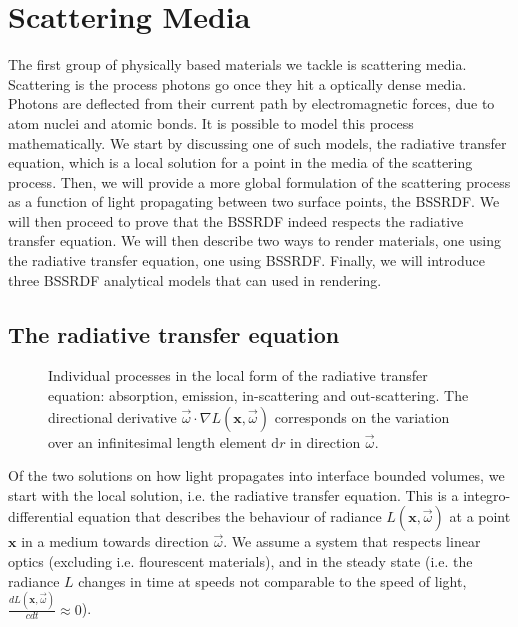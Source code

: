 \section{Scattering Media}
\label{sec:scatteringtheory}
The first group of physically based materials we tackle is scattering media. Scattering is the process photons go once they hit a optically dense media. Photons are deflected from their current path by electromagnetic forces, due to atom nuclei and atomic bonds. It is possible to model this process mathematically. We start by discussing one of such models, the radiative transfer equation, which is a local solution for a point in the media of the scattering process. Then, we will provide a more global formulation of the scattering process as a function of light propagating between two surface points, the BSSRDF. We will then proceed to prove that the BSSRDF indeed respects the radiative transfer equation. We will then describe two ways to render materials, one using the radiative transfer equation, one using BSSRDF. Finally, we will introduce three BSSRDF analytical models that can used in rendering.

\subsection{The radiative transfer equation}
\begin{figure}
\centering
{}
\caption{Individual processes in the local form of the radiative transfer equation: absorption, emission, in-scattering and out-scattering. The directional derivative $\vec{\omega} \cdot \nabla L(\mathbf{x}, \vec{\omega})$ corresponds on the variation over an infinitesimal length element $\text{d}r$ in direction $\vec{\omega}$. } 
\label{fig:rte_elements}
\end{figure}
Of the two solutions on how light propagates into interface bounded volumes, we start with the local solution, i.e. the radiative transfer equation. This is a integro-differential equation that describes the behaviour of radiance $L(\mathbf{x}, \vec{\omega})$ at a point $\mathbf{x}$ in a medium towards direction $\vec{\omega}$. We assume a system that respects linear optics (excluding i.e. flourescent materials), and in the steady state (i.e. the radiance $L$ changes in time at speeds not comparable to the speed of light, $\frac{dL(\mathbf{x}, \vec{\omega})}{c dt} \approx 0$).

